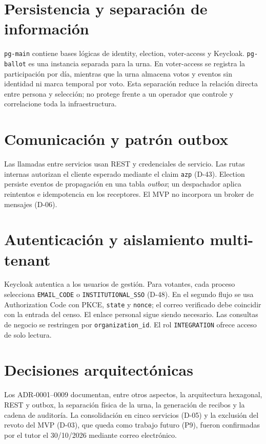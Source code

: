 \section{Persistencia y separación de información}
\texttt{pg-main} contiene bases lógicas de identity, election, voter-access y
Keycloak. \texttt{pg-ballot} es una instancia separada para la urna. En
voter-access se registra la participación por día, mientras que la urna
almacena votos y eventos sin identidad ni marca temporal por voto. Esta
separación reduce la relación directa entre persona y selección; no protege
frente a un operador que controle y correlacione toda la infraestructura.

\section{Comunicación y patrón outbox}
Las llamadas entre servicios usan REST y credenciales de servicio. Las rutas
internas autorizan el cliente esperado mediante el claim \texttt{azp} (D-43).
Election persiste eventos de propagación en una tabla \emph{outbox}; un
despachador aplica reintentos e idempotencia en los receptores. El MVP no
incorpora un broker de mensajes (D-06).

\section{Autenticación y aislamiento multi-tenant}
Keycloak autentica a los usuarios de gestión. Para votantes, cada proceso
selecciona \texttt{EMAIL\_CODE} o \texttt{INSTITUTIONAL\_SSO} (D-48). En el
segundo flujo se usa Authorization Code con PKCE, \texttt{state} y
\texttt{nonce}; el correo verificado debe coincidir con la entrada del censo.
El enlace personal sigue siendo necesario. Las consultas de negocio se
restringen por \texttt{organization\_id}. El rol \texttt{INTEGRATION} ofrece
acceso de solo lectura.

\section{Decisiones arquitectónicas}
Los ADR-0001--0009 documentan, entre otros aspectos, la arquitectura
hexagonal, REST y outbox, la separación física de la urna, la generación de
recibos y la cadena de auditoría. La consolidación en cinco servicios (D-05)
y la exclusión del revoto del MVP (D-03), que queda como trabajo futuro (P9),
fueron confirmadas por el tutor el 30/10/2026 mediante correo
electrónico.

